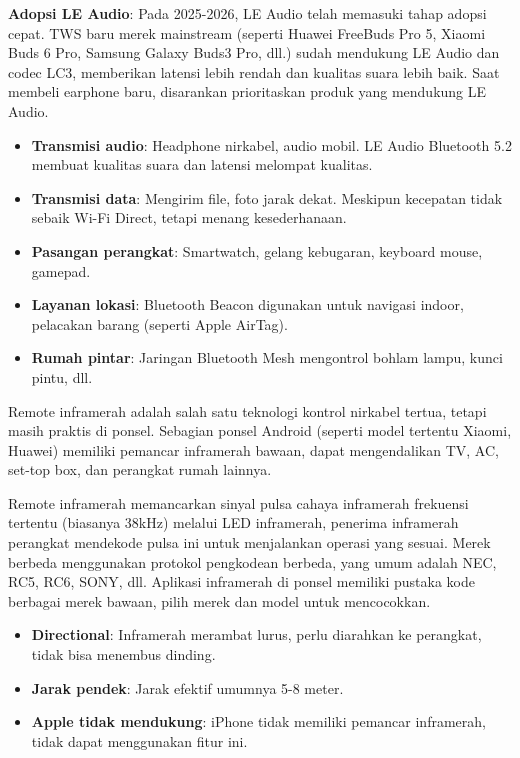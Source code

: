 \textbf{Adopsi LE Audio}: Pada 2025-2026, LE Audio telah memasuki tahap adopsi cepat. TWS baru merek mainstream (seperti Huawei FreeBuds Pro 5, Xiaomi Buds 6 Pro, Samsung Galaxy Buds3 Pro, dll.) sudah mendukung LE Audio dan codec LC3, memberikan latensi lebih rendah dan kualitas suara lebih baik. Saat membeli earphone baru, disarankan prioritaskan produk yang mendukung LE Audio.


\begin{itemize}
  \item \textbf{Transmisi audio}: Headphone nirkabel, audio mobil. LE Audio Bluetooth 5.2 membuat kualitas suara dan latensi melompat kualitas.
  \item \textbf{Transmisi data}: Mengirim file, foto jarak dekat. Meskipun kecepatan tidak sebaik Wi-Fi Direct, tetapi menang kesederhanaan.
  \item \textbf{Pasangan perangkat}: Smartwatch, gelang kebugaran, keyboard mouse, gamepad.
  \item \textbf{Layanan lokasi}: Bluetooth Beacon digunakan untuk navigasi indoor, pelacakan barang (seperti Apple AirTag).
  \item \textbf{Rumah pintar}: Jaringan Bluetooth Mesh mengontrol bohlam lampu, kunci pintu, dll.
\end{itemize}


Remote inframerah adalah salah satu teknologi kontrol nirkabel tertua, tetapi masih praktis di ponsel. Sebagian ponsel Android (seperti model tertentu Xiaomi, Huawei) memiliki pemancar inframerah bawaan, dapat mengendalikan TV, AC, set-top box, dan perangkat rumah lainnya.


Remote inframerah memancarkan sinyal pulsa cahaya inframerah frekuensi tertentu (biasanya 38kHz) melalui LED inframerah, penerima inframerah perangkat mendekode pulsa ini untuk menjalankan operasi yang sesuai. Merek berbeda menggunakan protokol pengkodean berbeda, yang umum adalah NEC, RC5, RC6, SONY, dll. Aplikasi inframerah di ponsel memiliki pustaka kode berbagai merek bawaan, pilih merek dan model untuk mencocokkan.


\begin{itemize}
  \item \textbf{Directional}: Inframerah merambat lurus, perlu diarahkan ke perangkat, tidak bisa menembus dinding.
  \item \textbf{Jarak pendek}: Jarak efektif umumnya 5-8 meter.
  \item \textbf{Apple tidak mendukung}: iPhone tidak memiliki pemancar inframerah, tidak dapat menggunakan fitur ini.
\end{itemize}

